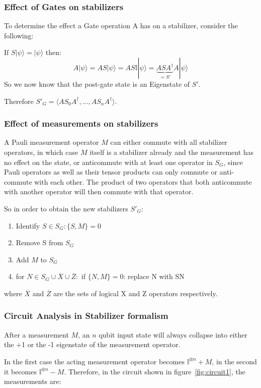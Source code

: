 \subsubsection{Effect of Gates on stabilizers}
To determine the effect a Gate operation A has on a
stabilizer, consider the following:

If $S|\psi\rangle = |\psi\rangle$ then:
\begin{equation}
A|\psi\rangle = AS|\psi\rangle = AS\mathbb{I}|\psi\rangle
	= \underbrace{ASA^{\dagger}}_{=S'}A|\psi\rangle
\end{equation}
So we now know that the post-gate state is an Eigenstate of $S'$.

Therefore $S'_{G} = \langle AS_{0}A^{\dagger},...,AS_{n}A^{\dagger}\rangle$.


\subsubsection{Effect of measurements on stabilizers}
A Pauli measurement operator $M$ can either commute with all stabilizer
operators, in which case $M$ itself is a stabilizer already and the
measurement has no effect on the state, or anticommute with at
least one operator in $S_{G}$, since Pauli operators as well as
their tensor products can only commute or anti-commute with each
other. The product of two operators that both anticommute with another operator
will then commute with that operator.

So in order to obtain the new stabilizers  $S'_{G}$:
\begin{enumerate}
	\item Identify $S\in S_{G}: \{S,M\}=0$
	\item Remove S from $S_G$
	\item Add $M$ to $S_G$ 
	\item for $N \in S_G \cup\overline{X}\cup\overline{Z}:$
		if $\{N,M\}=0$: replace N with SN
\end{enumerate}
where $\overline{X}$ and $\overline{Z}$ are the sets of 
logical X and Z operators respectively.

\subsubsection{Circuit Analysis in Stabilizer formalism}
After a measurement $M$, an $n$ qubit input state will always 
collapse into either the +1 or the -1 eigenstate of the 
measurement operator.

In the first case the acting measurement operator becomes 
$\mathbb{I}^{\otimes n}+M$, in the second it becomes
$\mathbb{I}^{\otimes n}-M$. Therefore, in the circuit shown in 
figure~\ref{fig:circuit1}, the measurements are:

